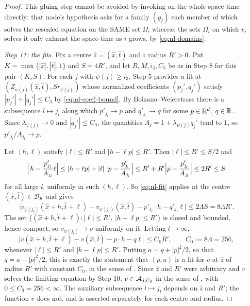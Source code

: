 \begin{proof}
This gluing step cannot be avoided by invoking
 on the whole space-time directly: that node's
hypothesis asks for a family $(g_j)$ each member of which solves the rescaled
equation on the SAME set $\Omega$, whereas the sets $\Omega_i$ on which $v_i$
solves it only exhaust the space-time as $i$ grows, by \eqref{eq:nl-domains}.

\emph{Step 11: the fits.}
Fix a centre $\hat z=(\hat x,\hat t)$ and a radius $R'>0$. Put
$K=\max\{|\hat x|,|\hat t|,1\}$ and $S=4R'$, and let $R,M,i_3,C_3$ be as in
Step 8 for this pair $(K,S)$. For each $j$ with $\psi(j)\ge i_3$, Step 5
provides a fit at $(Z_{\psi(j)}(\hat x,\hat t),Sr_{\psi(j)})$ whose normalized
coefficients $(p_j',q_j')$ satisfy $|p_j'|+|q_j'|\le C_3$ by
\eqref{eq:nl-coeff-bound}. By Bolzano--Weierstrass there is a subsequence
$l\mapsto j_l$ along which $p'_{j_l}\to p$ and $q'_{j_l}\to q$ for some
$p\in\mathbb{R}^d$, $q\in\mathbb{R}$. Since $\lambda_{\psi(j)}\to0$ and $|q_j'|\le C_3$, the
quantities $A_{j}=1+\lambda_{\psi(j)}q_j'$ tend to $1$, so
$p'_{j_l}/A_{j_l}\to p$.

Let $(h,\ell)$ satisfy $|\ell|\le R'$ and $|h-\ell p|\le R'$. Then
$|\ell|\le R'\le S/2$ and
\[
  \Bigl|h-\frac{p'_{j_l}}{A_{j_l}}\ell\Bigr|
   \le|h-\ell p|+|\ell|\,\Bigl|p-\frac{p'_{j_l}}{A_{j_l}}\Bigr|
   \le R'+R'\Bigl|p-\frac{p'_{j_l}}{A_{j_l}}\Bigr|\le 2R'\le S
\]
for all large $l$, uniformly in such $(h,\ell)$. So \eqref{eq:nl-fit} applies at
the centre $(\hat x,\hat t)\in\mathcal B_K$ and gives
\[
  \bigl|v_{\psi(j_l)}(\hat x+h,\hat t+\ell)-v_{\psi(j_l)}(\hat x,\hat t)
     -p'_{j_l}\cdot h-q'_{j_l}\ell\bigr|\le2\Lambda S=8\Lambda R' .
\]
The set $\{(\hat x+h,\hat t+\ell):|\ell|\le R',\ |h-\ell p|\le R'\}$ is closed
and bounded, hence compact, so $v_{\psi(j_l)}\to v$ uniformly on it. Letting
$l\to\infty$,
\[
  \bigl|v(\hat x+h,\hat t+\ell)-v(\hat x,\hat t)-p\cdot h-q\ell\bigr|
    \le C_0R',\qquad C_0:=8\Lambda=256,
\]
whenever $|\ell|\le R'$ and $|h-\ell p|\le R'$. Putting $a=q+|p|^2/2$, so that
$q=a-|p|^2/2$, this is exactly the statement that $(p,a)$ is a fit for $v$ at
$\hat z$ of radius $R'$ with constant $C_0$, in the sense of .
Since $\hat z$ and $R'$ were arbitrary and $v$ solves the limiting equation by
Step 10, $v\in\mathcal{A}_{d,C_0}$ in the sense of , with
$0\le C_0=256<\infty$. The auxiliary subsequence $l\mapsto j_l$ depends on
$\hat z$ and $R'$; the function $v$ does not, and  is asserted
separately for each centre and radius.


\end{proof}
